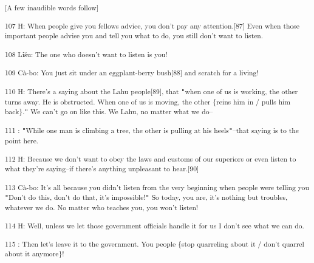 {\textsuperscript{[A few inaudible words follow]}}

{\textsuperscript{107 H: When people give you fellows advice, you don't
pay any attention.[87] Even when those important people advise you and tell you
what to do, you still don't want to listen.}}

{\textsuperscript{108 Lišu: The one who doesn't want to listen is you!}}

{\textsuperscript{109 Cà-bo: You just sit under an eggplant-berry bush[88]
and scratch for a living!}}

{\textsuperscript{110 H: There's a saying about the Lahu people[89], that
\texttt{"}when one of us is working, the other turns away. He is obstructed. When
one of us is moving, the other \{reins him in / pulls him back\}.\texttt{"} We
can't go on like this. We Lahu, no matter what we do--}}

{\textsuperscript{111    : \texttt{"}While one man is climbing a tree, the
other is pulling at his heels\texttt{"}--that saying is to the point here.}}

{\textsuperscript{112 H: Because we don't want to obey the laws and customs
of our superiors or even listen to what they're saying--if there's anything unpleasant
to hear.[90]}}

{\textsuperscript{113 Cà-bo: It's all because you didn't listen from the
very beginning when people were telling you \texttt{"}Don't do this, don't do that,
it's impossible!\texttt{"} So today, you are, it's nothing but troubles, whatever
we do. No matter who teaches you, you won't listen!}}

{\textsuperscript{114 H: Well, unless we let those government officials
handle it for us I don't see what we can do. }}

{\textsuperscript{115    : Then let's leave it to the government. You people
\{stop quarreling about it / don't quarrel about it anymore\}!}}

